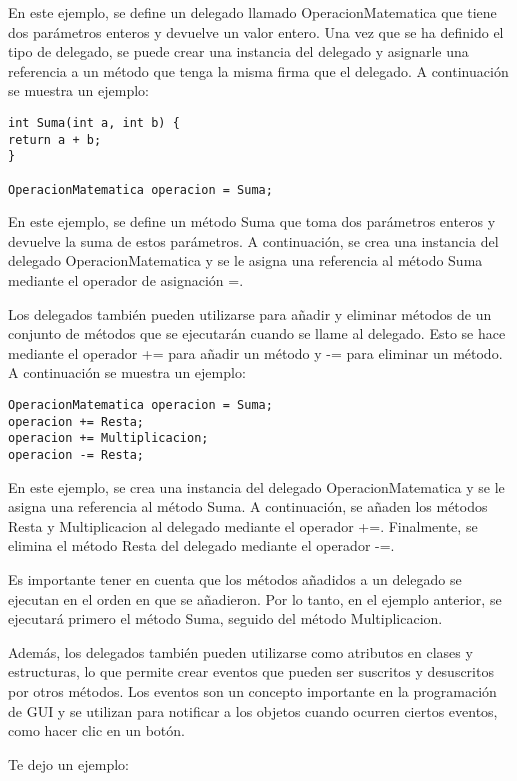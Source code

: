 \documentclass[executivepaper]{article}
\begin{document}
En este ejemplo, se define un delegado llamado OperacionMatematica que tiene dos parámetros enteros y devuelve un valor entero. Una vez que se ha definido el tipo de delegado, se puede crear una instancia del delegado y asignarle una referencia a un método que tenga la misma firma que el delegado. A continuación se muestra un ejemplo:

\begin{lstlisting}
int Suma(int a, int b) {
return a + b;
}

OperacionMatematica operacion = Suma;
\end{lstlisting}

En este ejemplo, se define un método Suma que toma dos parámetros enteros y devuelve la suma de estos parámetros. A continuación, se crea una instancia del delegado OperacionMatematica y se le asigna una referencia al método Suma mediante el operador de asignación =.

Los delegados también pueden utilizarse para añadir y eliminar métodos de un conjunto de métodos que se ejecutarán cuando se llame al delegado. Esto se hace mediante el operador += para añadir un método y -= para eliminar un método. A continuación se muestra un ejemplo:

\begin{lstlisting}
OperacionMatematica operacion = Suma;
operacion += Resta;
operacion += Multiplicacion;
operacion -= Resta;
\end{lstlisting}

En este ejemplo, se crea una instancia del delegado OperacionMatematica y se le asigna una referencia al método Suma. A continuación, se añaden los métodos Resta y Multiplicacion al delegado mediante el operador +=. Finalmente, se elimina el método Resta del delegado mediante el operador -=.

Es importante tener en cuenta que los métodos añadidos a un delegado se ejecutan en el orden en que se añadieron. Por lo tanto, en el ejemplo anterior, se ejecutará primero el método Suma, seguido del método Multiplicacion.

Además, los delegados también pueden utilizarse como atributos en clases y estructuras, lo que permite crear eventos que pueden ser suscritos y desuscritos por otros métodos. Los eventos son un concepto importante en la programación de GUI y se utilizan para notificar a los objetos cuando ocurren ciertos eventos, como hacer clic en un botón.

Te dejo un ejemplo:
\end{document}
